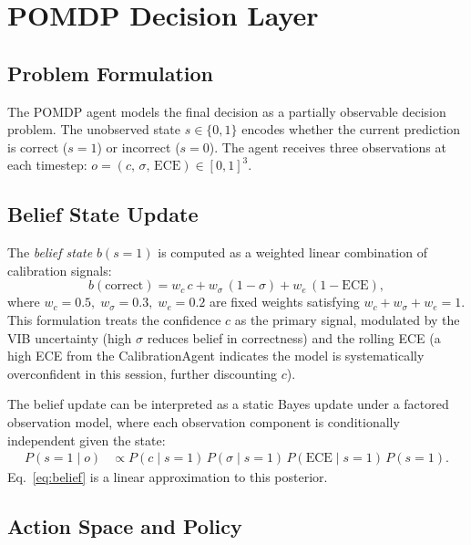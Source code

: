 \documentclass[conference]{IEEEtran}
\begin{document}
\section{POMDP Decision Layer}
\label{sec:pomdp}

\subsection{Problem Formulation}

The POMDP agent models the final decision as a partially observable
decision problem. The unobserved state $s\in\{0,1\}$ encodes whether
the current prediction is correct ($s=1$) or incorrect ($s=0$).
The agent receives three observations at each timestep:
$o=(c,\,\sigma,\,\text{ECE})\in[0,1]^3$.

\subsection{Belief State Update}

The \emph{belief state} $b(s=1)$ is computed as a weighted linear
combination of calibration signals:
\begin{equation}
    b(\text{correct}) = w_c\,c + w_\sigma\,(1-\sigma) + w_e\,(1-\text{ECE}),
    \label{eq:belief}
\end{equation}
where $w_c = 0.5,\; w_\sigma = 0.3,\; w_e = 0.2$ are fixed weights
satisfying $w_c+w_\sigma+w_e=1$.
This formulation treats the confidence $c$ as the primary signal,
modulated by the VIB uncertainty (high $\sigma$ reduces belief in
correctness) and the rolling ECE (a high ECE from the CalibrationAgent
indicates the model is systematically overconfident in this session,
further discounting $c$).

The belief update can be interpreted as a static Bayes update under a
factored observation model, where each observation component is
conditionally independent given the state:
\begin{align}
    P(s=1 \mid o) &\propto P(c\mid s=1)\,P(\sigma\mid s=1)\,P(\text{ECE}\mid s=1)\,P(s=1).
    \label{eq:bayes_belief}
\end{align}
Eq.~\ref{eq:belief} is a linear approximation to this posterior.

\subsection{Action Space and Policy}
\end{document}
